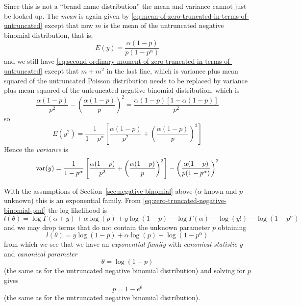 Since this is not a ``brand name distribution'' the mean and variance
cannot just be looked up.  The \emph{mean} is again given by
\eqref{eq:mean-of-zero-truncated-in-terms-of-untruncated} except
that now $m$ is the mean of the untruncated negative binomial distribution,
that is,
$$
   E(y) = \frac{\alpha (1 - p)}{p (1 - p^\alpha)}
$$
and we still have
\eqref{eq:second-ordinary-moment-of-zero-truncated-in-terms-of-untruncated}
except that $m + m^2$ in the last line, which is variance plus mean squared
of the untruncated Poisson distribution needs to be replaced by
variance plus mean squared of the untruncated negative binomial distribution,
which is
$$
   \frac{\alpha (1 - p)}{p^2} - \left( \frac{\alpha (1 - p)}{p} \right)^2
   =
   \frac{\alpha (1 - p) [1 - \alpha (1 - p)]}{p^2}
$$
so
$$
   E(y^2)
   =
   \frac{1}{1 - p^\alpha}
   \left[ \frac{\alpha (1 - p)}{p^2} + \left( \frac{\alpha (1 - p)}{p}
   \right)^2 \right]
$$
Hence the \emph{variance} is
$$
   \operatorname{var}(y)
   =
   \frac{1}{1 - p^\alpha}
   \left[ \frac{\alpha (1 - p)}{p^2} + \left( \frac{\alpha (1 - p)}{p}
   \right)^2 \right]
   -
   \left( \frac{\alpha (1 - p)}{p (1 - p^\alpha)} \right)^2
$$
%

With the assumptions of Section~\ref{sec:negative-binomial} above
($\alpha$ known and $p$ unknown) this is an exponential family.
From \eqref{eq:zero-truncated-negative-binomial-pmf} the log likelihood is
$$
   l(\theta)
   =
   \log \Gamma(\alpha + y) + \alpha \log(p) + y \log(1-p)
   - \log \Gamma(\alpha) - \log(y!) - \log(1 - p^\alpha)
$$
and we may drop terms that do not contain the unknown parameter $p$ obtaining
$$
   l(\theta)
   =
   y \log(1-p) + \alpha \log(p) - \log(1 - p^\alpha)
$$
from which we see that we have an \emph{exponential family} with
\emph{canonical statistic} $y$ and \emph{canonical parameter}
$$
   \theta = \log(1 - p)
$$
(the same as for the untruncated negative binomial distribution)
and solving for $p$ gives
$$
   p = 1 - e^\theta
$$
(the same as for the untruncated negative binomial distribution).

